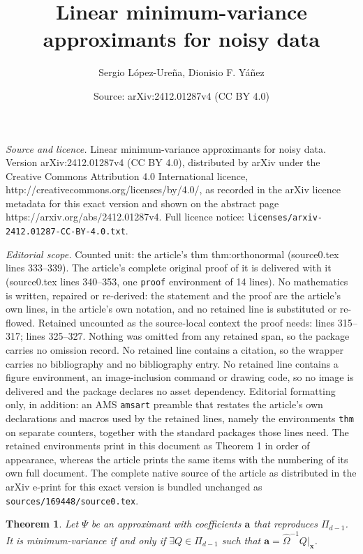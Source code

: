 \documentclass[10pt,a4paper]{amsart}
\title{Linear minimum-variance approximants for noisy data}
\author{Sergio L\'opez-Ure\~na, Dionisio F. Y\'a\~nez}
\date{Source: arXiv:2412.01287v4 (CC BY 4.0)}
\newtheorem{thm}{Theorem}
\newcommand{\ba}{\bm{a}}
\newcommand{\bx}{\bm{x}}
\begin{document}
\maketitle

\noindent\emph{Source and licence.} Linear minimum-variance approximants for noisy data. Version arXiv:2412.01287v4 (CC BY 4.0), distributed by arXiv under the Creative Commons Attribution 4.0 International licence, http://creativecommons.org/licenses/by/4.0/, as recorded in the arXiv licence metadata for this exact version and shown on the abstract page https://arxiv.org/abs/2412.01287v4. Full licence notice: \texttt{licenses/arxiv-2412.01287-CC-BY-4.0.txt}.\par\smallskip

\noindent\textit{Editorial scope.} Counted unit: the article's thm thm:orthonormal (source0.tex lines 333--339). The article's complete original proof of it is delivered with it (source0.tex lines 340--353, one \texttt{proof} environment of 14 lines). No mathematics is written, repaired or re-derived: the statement and the proof are the article's own lines, in the article's own notation, and no retained line is substituted or re-flowed.  Retained uncounted as the source-local context the proof needs: lines 315--317; lines 325--327.  Nothing was omitted from any retained span, so the package carries no omission record.  No retained line contains a citation, so the wrapper carries no bibliography and no bibliography entry.  No retained line contains a figure environment, an image-inclusion command or drawing code, so no image is delivered and the package declares no asset dependency.  Editorial formatting only, in addition: an AMS \texttt{amsart} preamble that restates the article's own declarations and macros used by the retained lines, namely the environments \texttt{thm} on separate counters, together with the standard packages those lines need.  The retained environments print in this document as Theorem 1 in order of appearance, whereas the article prints the same items with the numbering of its own full document.  The complete native source of the article as distributed in the arXiv e-print for this exact version is bundled unchanged as \texttt{sources/169448/source0.tex}.
\begin{thm} \label{thm:caracterization_of_optimal}
	Let $\Psi$ be an approximant with coefficients $\ba$ that reproduces $\Pi_{d-1}$. It is minimum-variance if and only if $\exists Q\in\Pi_{d-1}$ such that $\ba = \hat \Omega^{-1} Q|_{\bx}$.
\end{thm}
\end{document}
